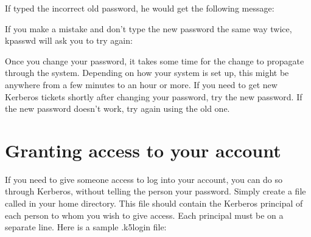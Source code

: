 \documentclass[letterpaper,10pt,english]{sphinxmanual}
\begin{document}
\sphinxAtStartPar
If  typed the incorrect old password, he would get the
following message:

\begin{sphinxVerbatim}[commandchars=\\\{\}]
 
         
      
\end{sphinxVerbatim}

\sphinxAtStartPar
If you make a mistake and don’t type the new password the same way
twice, kpasswd will ask you to try again:

\begin{sphinxVerbatim}[commandchars=\\\{\}]
 
        
        
        
     
\end{sphinxVerbatim}

\sphinxAtStartPar
Once you change your password, it takes some time for the change to
propagate through the system.  Depending on how your system is set up,
this might be anywhere from a few minutes to an hour or more.  If you
need to get new Kerberos tickets shortly after changing your password,
try the new password.  If the new password doesn’t work, try again
using the old one.


\section{Granting access to your account}
\label{\detokenize{user/pwd_mgmt:granting-access-to-your-account}}\label{\detokenize{user/pwd_mgmt:grant-access}}
\sphinxAtStartPar
If you need to give someone access to log into your account, you can
do so through Kerberos, without telling the person your password.
Simply create a file called {\hyperref[\detokenize{user/user_config/k5login:k5login-5}]{}} in your home directory.
This file should contain the Kerberos principal of each person to whom
you wish to give access.  Each principal must be on a separate line.
Here is a sample .k5login file:
\end{document}

